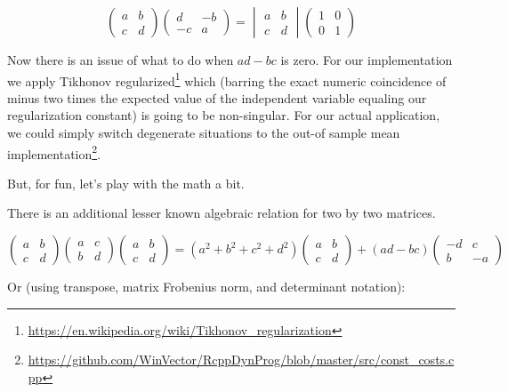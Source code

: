 \documentclass{article}
\begin{document}
\[ 
\begin{pmatrix} a & b \\ c & d \end{pmatrix}
\begin{pmatrix} d & -b \\ -c & a \end{pmatrix}
=
\begin{vmatrix} a & b \\ c & d \end{vmatrix}
\begin{pmatrix} 1 & 0 \\ 0 & 1 \end{pmatrix}
\]



Now there is an issue of what to do when $a d - b c$ is zero.  For our implementation we apply Tikhonov regularized\footnote{\url{https://en.wikipedia.org/wiki/Tikhonov_regularization}} which (barring the exact numeric coincidence of minus two times the expected value of the independent variable equaling our regularization constant) is going to be non-singular.  For our actual application, we could simply switch degenerate situations to the out-of sample mean implementation\footnote{\url{https://github.com/WinVector/RcppDynProg/blob/master/src/const_costs.cpp}}.

But, for fun, let's play with the math a bit.

There is an additional lesser known algebraic relation for two by two matrices.


\[ 
\begin{pmatrix} a & b \\ c & d \end{pmatrix}
\begin{pmatrix} a & c \\ b & d \end{pmatrix}
\begin{pmatrix} a & b \\ c & d \end{pmatrix}
=
(a^2 + b^2 + c^2 + d^2) 
\begin{pmatrix} a & b \\ c & d \end{pmatrix} 
+
(a d - b c)
\begin{pmatrix} -d & c \\ b & -a \end{pmatrix} 
\]

Or (using transpose, matrix Frobenius norm, and determinant notation):
\end{document}
